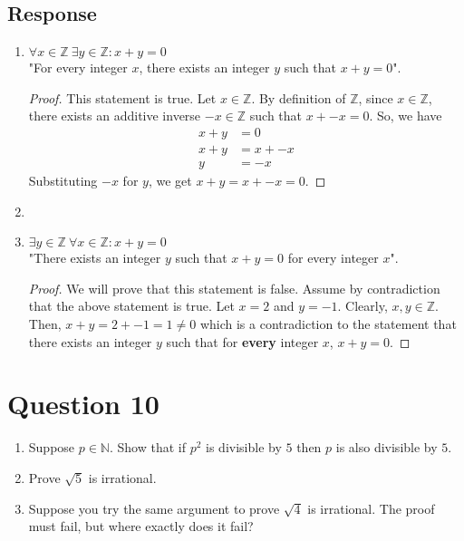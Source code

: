 \documentclass[13pt]{article}
\begin{document}
\subsection*{Response}
\begin{enumerate}[label=,leftmargin=0pt]
\item $\forall x \in \mathbb{Z} \ \exists y \in \mathbb{Z} : x + y = 0$ \\
"For every integer $x$, there exists an integer $y$ such that $x + y = 0$".
\begin{proof}
  This statement is true. Let $x \in \mathbb{Z}$. By definition of $\mathbb{Z}$, since $x \in \mathbb{Z}$, there exists an
  additive inverse $-x \in \mathbb{Z}$ such that $x + -x = 0$. So, we have
  \begin{align*}
    x + y &= 0 \\
    x + y &= x + -x \\
    y &= -x
  \end{align*}
  Substituting $-x$ for $y$, we get $x + y = x + -x = 0$.
\end{proof}
\item
\item $\exists y \in \mathbb{Z} \ \forall x \in \mathbb{Z} : x + y = 0$ \\
"There exists an integer $y$ such that $x + y = 0$ for every integer $x$".
\begin{proof}
  We will prove that this statement is false. Assume by contradiction that the above statement is true.
  Let $x = 2$ and $y = -1$. Clearly, $x, y \in \mathbb{Z}$. Then, $x + y = 2 + -1 = 1 \neq 0$ which
  is a contradiction to the statement that there exists an integer $y$ such that for \textbf{every} integer $x$,
  $x + y = 0$.
\end{proof}
\end{enumerate}





\newpage
\section*{Question 10}
\begin{enumerate}[label=(\alph*)]
\item Suppose $p \in \mathbb{N}$. Show that if $p^2$ is divisible by $5$ then $p$ is also divisible by $5$.
\item Prove $\sqrt{5}$ is irrational.
\item Suppose you try the same argument to prove $\sqrt{4}$ is irrational. The proof must fail,
but where exactly does it fail?
\end{enumerate}
\end{document}
